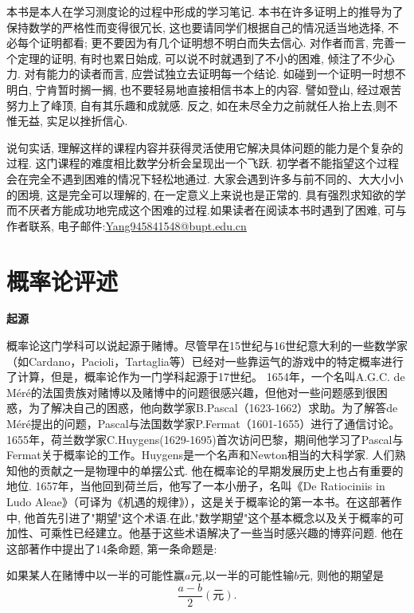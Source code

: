 本书是本人在学习测度论的过程中形成的学习笔记. 本书在许多证明上的推导为了保持数学的严格性而变得很冗长, 这也要请同学们根据自己的情况适当地选择, 不必每个证明都看; 更不要因为有几个证明想不明白而失去信心. 对作者而言, 完善一个定理的证明, 有时也累日始成, 可以说不时就遇到了不小的困难, 倾注了不少心力. 对有能力的读者而言, 应尝试独立去证明每一个结论. 如碰到一个证明一时想不明白, 宁肯暂时搁一搁, 也不要轻易地直接相信书本上的内容. 譬如登山, 经过艰苦努力上了峰顶, 自有其乐趣和成就感. 反之, 如在未尽全力之前就任人抬上去,则不惟无益, 实足以挫折信心.

说句实话, 理解这样的课程内容并获得灵活使用它解决具体问题的能力是个复杂的过程. 这门课程的难度相比数学分析会呈现出一个飞跃. 初学者不能指望这个过程会在完全不遇到困难的情况下轻松地通过. 大家会遇到许多与前不同的、大大小小的困境, 这是完全可以理解的, 在一定意义上来说也是正常的. 具有强烈求知欲的学而不厌者方能成功地完成这个困难的过程.如果读者在阅读本书时遇到了困难, 可与作者联系, 电子邮件:\url{Yang945841548@bupt.edu.cn}



\section{概率论评述}

\textbf{起源}

概率论这门学科可以说起源于赌博。尽管早在15世纪与16世纪意大利的一些数学家（如Cardano，Pacioli，Tartaglia等）已经对一些靠运气的游戏中的特定概率进行了计算，但是，概率论作为一门学科起源于17世纪。
1654年，一个名叫A.G.C. de Méré的法国贵族对赌博以及赌博中的问题很感兴趣，但他对一些问题感到很困惑，为了解决自己的困惑，他向数学家B.Pascal（1623-1662）求助。为了解答de Méré提出的问题，Pascal与法国数学家P.Fermat（1601-1655）进行了通信讨论。1655年，荷兰数学家C.Huygens(1629-1695)首次访问巴黎，期间他学习了Pascal与Fermat关于概率论的工作。Huygens是一个名声和Newton相当的大科学家. 人们熟知他的贡献之一是物理中的单摆公式. 他在概率论的早期发展历史上也占有重要的地位. 1657年，当他回到荷兰后，他写了一本小册子，名叫《De Ratiociniis in Ludo Aleae》（可译为《机遇的规律》），这是关于概率论的第一本书。在这部著作中, 他首先引进了"期望"这个术语.在此,"数学期望"这个基本概念以及关于概率的可加性、可乘性已经建立。他基于这些术语解决了一些当时感兴趣的博弈问题. 他在这部著作中提出了14条命题, 第一条命题是:

如果某人在赌博中以一半的可能性赢$a$元,以一半的可能性输$b$元, 则他的期望是\begin{equation}
\frac{a-b}{2} (\text{元}).\label{eq:A0}
\end{equation}

